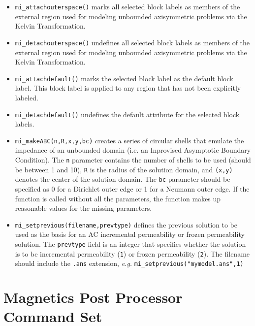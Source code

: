 \begin{itemize}
the {\tt Ro} parameter is the radius of the outer region, and the {\tt
Ri} parameter is the radius of the inner region ({\em i.e.} the region of
interest). In the exterior region, the permeability varies as a function of
distance from the origin of the external region.  These parameters
are necessary to define the permeability variation in the external
region.
\item{\tt mi\_attachouterspace()} marks all
selected block labels as members of the external region used for
modeling unbounded axisymmetric problems via the Kelvin
Transformation.
\item{\tt mi\_detachouterspace()} undefines all selected block labels
as members of the external region used for modeling unbounded axisymmetric
problems via the Kelvin Transformation.

\item{\tt mi\_attachdefault()} marks the
selected block label as the default block label.  This block label
is applied to any region that has not been explicitly labeled.

\item{\tt mi\_detachdefault()} undefines the default
attribute for the selected block labels.

\item{\tt mi\_makeABC(n,R,x,y,bc)} creates a series of circular shells that emulate the
impedance of an unbounded domain (i.e. an Inprovised Asymptotic Boundary
Condition).  The {\tt n} parameter contains the number of shells to be used
(should be between 1 and 10), {\tt R} is the radius of the solution domain, and
{\tt (x,y)} denotes the center of the solution domain.  The {\tt bc} parameter should
be specified as 0 for a Dirichlet outer edge or 1 for a Neumann outer edge.
If the function is called without all the parameters, the function makes up
reasonable values for the missing parameters. 

\item{\tt mi\_setprevious(filename,prevtype)} defines the previous solution to be used as the basis for an AC incremental
permeability or frozen permeability solution.  The {\tt prevtype} field is an integer that specifies whether the solution 
is to be incremental permeability ({\tt 1}) or frozen permeability ({\tt 2}). The filename should include the {\tt .ans}
extension, {\em e.g.} {\tt mi\_setprevious("mymodel.ans",1)}

\end{itemize}

\section{Magnetics Post Processor Command Set}

